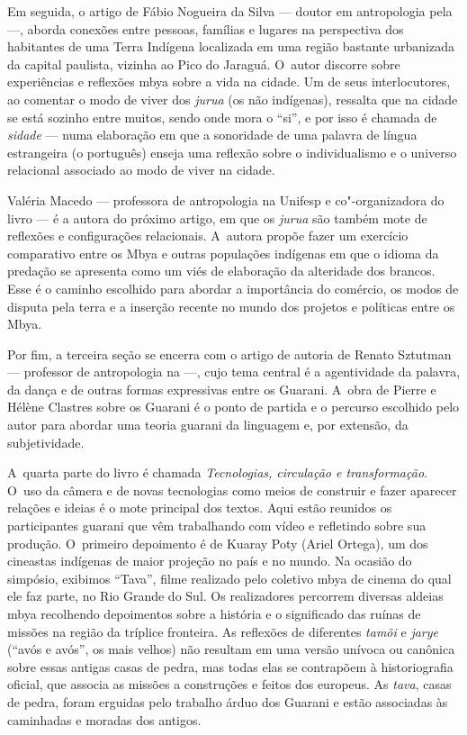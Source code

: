 Em seguida, o artigo de Fábio Nogueira da Silva --- doutor em antropologia
pela  ---, aborda conexões entre pessoas, famílias e lugares na
perspectiva dos habitantes de uma Terra Indígena localizada em uma
região bastante urbanizada da capital paulista, vizinha ao Pico do
Jaraguá. O~autor discorre sobre experiências e reflexões mbya sobre a
vida na cidade. Um de seus interlocutores, ao comentar o modo de viver
dos \emph{jurua} (os não indígenas), ressalta que na cidade se está sozinho
entre muitos, sendo onde mora o ``si'', e por isso é chamada de \emph{sidade} ---
numa elaboração em que a sonoridade de uma palavra de língua
estrangeira (o português) enseja uma reflexão sobre o individualismo e
o universo relacional associado ao modo de viver na cidade.

Valéria Macedo --- professora de antropologia na Unifesp e co"-organizadora
do livro --- é a autora do próximo artigo, em que os \emph{jurua} são também
mote de reflexões e configurações relacionais. A~autora propõe fazer um
exercício comparativo entre os Mbya e outras populações indígenas em
que o idioma da predação se apresenta como um viés de elaboração da
alteridade dos brancos. Esse é o caminho escolhido para abordar a
importância do comércio, os modos de disputa pela terra e a inserção
recente no mundo dos projetos e políticas entre os Mbya. 

Por fim, a terceira seção se encerra com o artigo de autoria de Renato
Sztutman --- professor de antropologia na  ---, cujo tema central é a
agentividade da palavra, da dança e de outras formas expressivas entre
os Guarani. A~obra de Pierre e Hélène Clastres sobre os Guarani é o
ponto de partida e o percurso escolhido pelo autor para abordar uma
teoria guarani da linguagem e, por extensão, da subjetividade. 

A~quarta parte do livro é chamada \emph{Tecnologias, circulação e
transformação}. O~uso da câmera e de novas tecnologias como meios de
construir e fazer aparecer relações e ideias é o mote principal dos
textos. Aqui estão reunidos os participantes guarani que vêm
trabalhando com vídeo e refletindo sobre sua produção. O~primeiro
depoimento é de Kuaray Poty (Ariel Ortega), um dos cineastas indígenas
de maior projeção no país e no mundo. Na ocasião do simpósio, exibimos
``Tava'', filme realizado pelo coletivo mbya de cinema do qual ele faz
parte, no Rio Grande do Sul. Os realizadores percorrem diversas aldeias
mbya recolhendo depoimentos sobre a história e o significado das ruínas
de missões na região da tríplice fronteira. As reflexões de diferentes
\emph{tamõi} e \emph{jarye} (``avós e avós'', os mais velhos) não resultam em uma
versão unívoca ou canônica sobre essas antigas casas de pedra, mas
todas elas se contrapõem à historiografia oficial, que associa as
missões a construções e feitos dos europeus. As \emph{tava}, casas de pedra,
foram erguidas pelo trabalho árduo dos Guarani e estão associadas às
caminhadas e moradas dos antigos. 

